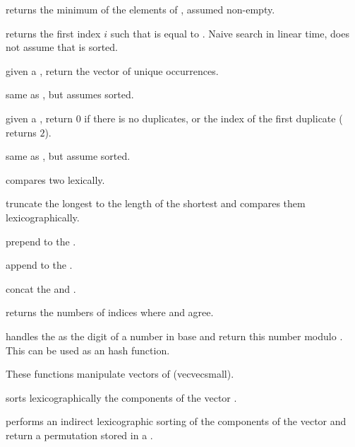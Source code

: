  returns the minimum of the elements of
 , assumed non-empty.

 returns the first index $i$
such that  is equal to . Naive search in linear time, does
not assume that  is sorted.

 given a  , return
the vector of unique occurrences.

 same as , but assumes
  sorted.

 given a  , return
$0$ if there is no duplicates, or the index of the first duplicate
( returns $2$).

 same as
, but assume  sorted.

 compares two  lexically.

 truncate the longest 
to the length of the shortest and compares them lexicographically.

 prepend  to the  .

 append  to the  .

 concat the   and .

 returns the numbers of indices where  and  agree.

 handles the
  as the digit of a number in base  and return
this number modulo . This can be used as an hash function.

These functions manipulate vectors of  (vecvecsmall).

 sorts lexicographically the components of
the vector .

 performs an indirect lexicographic sorting of the components of the vector  and return a permutation stored in a .

